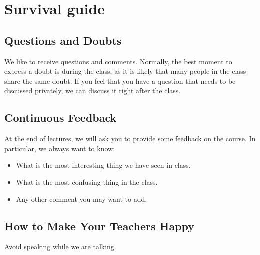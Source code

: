 \section{Survival guide}

\subsection{Questions and Doubts}

We like to receive questions and comments. Normally, the best moment to express a doubt is during the class, as it is likely that many people in the class share the same doubt. If you feel that you have a question that needs to be discussed privately, we can discuss it right after the class.

\subsection{Continuous Feedback}

At the end of lectures, we will ask you to provide some feedback on the course. In particular, we always want to know:
\begin{itemize}
\item What is the most interesting thing we have seen in class.
\item What is the most confusing thing in the class.
\item Any other comment you may want to add.

\end{itemize}

\subsection{How to Make Your Teachers Happy}

Avoid speaking while we are talking.
